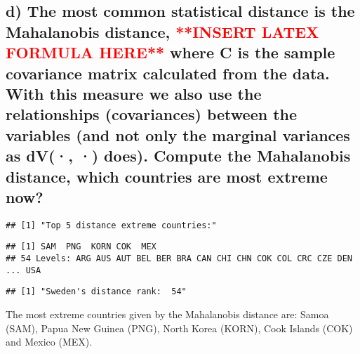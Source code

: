 \documentclass[]{article}
\begin{document}
\hypertarget{d-the-most-common-statistical-distance-is-the-mahalanobis-distance-where-c-is-the-sample-covariance-matrix-calculated-from-the-data.-with-this-measure-we-also-use-the-relationships-covariances-between-the-variables-and-not-only-the-marginal-variances-as-dv-does.-compute-the-mahalanobis-distance-which-countries-are-most-extreme-now}{%
\subsection{\texorpdfstring{d) The most common statistical distance is
the Mahalanobis distance, \textcolor{red}{**INSERT LATEX FORMULA HERE**}
where C is the sample covariance matrix calculated from the data. With
this measure we also use the relationships (covariances) between the
variables (and not only the marginal variances as dV(·, ·) does).
Compute the Mahalanobis distance, which countries are most extreme
now?}{d) The most common statistical distance is the Mahalanobis distance,  where C is the sample covariance matrix calculated from the data. With this measure we also use the relationships (covariances) between the variables (and not only the marginal variances as dV(·, ·) does). Compute the Mahalanobis distance, which countries are most extreme now?}}\label{d-the-most-common-statistical-distance-is-the-mahalanobis-distance-where-c-is-the-sample-covariance-matrix-calculated-from-the-data.-with-this-measure-we-also-use-the-relationships-covariances-between-the-variables-and-not-only-the-marginal-variances-as-dv-does.-compute-the-mahalanobis-distance-which-countries-are-most-extreme-now}}

\begin{verbatim}
## [1] "Top 5 distance extreme countries:"
\end{verbatim}

\begin{verbatim}
## [1] SAM  PNG  KORN COK  MEX 
## 54 Levels: ARG AUS AUT BEL BER BRA CAN CHI CHN COK COL CRC CZE DEN ... USA
\end{verbatim}

\begin{verbatim}
## [1] "Sweden's distance rank:  54"
\end{verbatim}

The most extreme countries given by the Mahalanobis distance are: Samoa
(SAM), Papua New Guinea (PNG), North Korea (KORN), Cook Islands (COK)
and Mexico (MEX).
\end{document}
